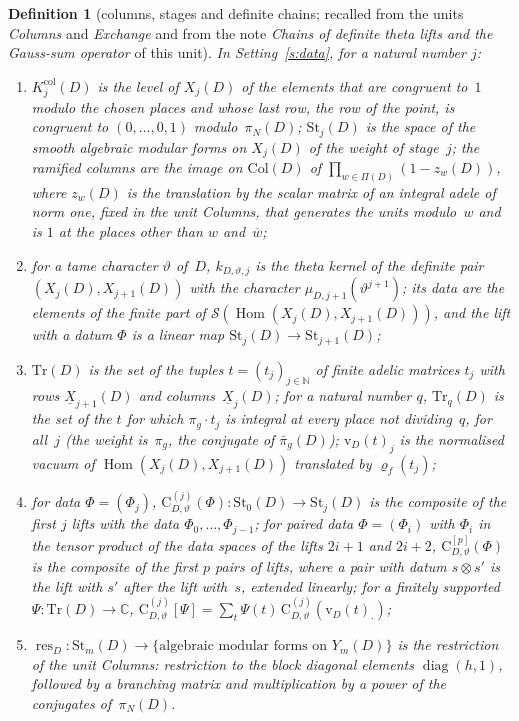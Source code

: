 \documentclass[11pt,a4paper]{article}
\newcommand{\Hom}{\operatorname{Hom}}
\newcommand{\m}[1]{\mbox{$#1$}}        %
\theoremstyle{plainx}
\theoremstyle{uprightx}
\newtheorem{definition}[theorem]{Definition}
\newcommand{\CC}{\mathbb{C}}
\newcommand{\NN}{\mathbb{N}}
\newcommand{\cj}[1]{\overline{#1}}
\newcommand{\tensor}{\otimes}
\newcommand{\piN}[1]{\pi_N(#1)}                    %
\newcommand{\piGb}[1]{\bar\pi_g(#1)}               %
\newcommand{\XI}[2]{\underline{X}_{#2}(#1)}        %
\newcommand{\Xs}[2]{X_{#2}(#1)}                    %
\newcommand{\Ys}[2]{Y_{#2}(#1)}                    %
\newcommand{\PiD}[1]{\Pi(#1)}                      %
\newcommand{\muc}[3]{\mu_{#1,#3}(#2)}              %
\newcommand{\Col}[1]{\mathrm{Col}(#1)}             %
\newcommand{\Stg}[2]{\mathrm{St}_{#2}(#1)}         %
\newcommand{\Tr}[1]{\mathrm{Tr}(#1)}               %
\newcommand{\Tadm}[2]{\mathrm{Tr}_{#2}(#1)}        %
\newcommand{\tdat}[3]{\mathrm{v}_{#1}(#2)_{#3}}    %
\newcommand{\Kst}[2]{K^{\mathrm{col}}_{#2}(#1)}                   %
\newcommand{\kerX}[3]{k_{#1,#2,#3}}                %
\newcommand{\chn}[4]{\mathrm{C}^{(#4)}_{#1,#2}(#3)}        %
\newcommand{\chnn}[4]{\mathrm{C}^{[#4]}_{#1,#2}(#3)}       %
\newcommand{\chcomb}[4]{\mathrm{C}^{(#4)}_{#1,#2}[#3]}     %
\newcommand{\resY}[1]{\operatorname{res}_{#1}}     %
\newcommand{\zw}[2]{z_{#2}(#1)}                     %
\begin{document}
\begin{definition}[columns, stages and definite chains; recalled from the units \emph{Columns} and
\emph{Exchange} and from the note \emph{Chains of definite theta lifts and the Gauss-sum operator} of this
unit]\label{d:columns}
In Setting~\ref{s:data}, for a natural number $j$:
\begin{enumerate}[label=(\alph*)]
\item $\Kst{D}{j}$ is the level of $\Xs{D}{j}$ of the elements that are congruent to~$1$ modulo the chosen places
  and whose last row, the row of the point, is congruent to \m{(0,\dots,0,1)} modulo~$\piN{D}$; $\Stg{D}{j}$ is the
  space of the smooth algebraic modular forms on $\Xs{D}{j}$ of the weight of stage~$j$; the ramified columns are
  the image on $\Col{D}$ of \m{\prod_{w\in\PiD{D}}(1-\zw{D}{w})}, where $\zw{D}{w}$ is the translation by the scalar
  matrix of an integral adele of norm one, fixed in the unit \emph{Columns}, that generates the units modulo~$w$
  and is $1$ at the places other than $w$ and~$\cj w$;
\item for a tame character $\vartheta$ of~$D$, \m{\kerX{D}{\vartheta}{j}} is the theta kernel of the definite pair
  \m{(\Xs{D}{j},\Xs{D}{j+1})} with the character \m{\muc{D}{\vartheta^{j+1}}{j+1}}; its data are the elements of
  the finite part of $\mathcal{S}(\Hom(\Xs{D}{j},\Xs{D}{j+1}))$, and the lift with a datum $\Phi$ is a linear map
  $\Stg{D}{j}\to\Stg{D}{j+1}$;
\item $\Tr{D}$ is the set of the tuples \m{t=(t_j)_{j\in\NN}} of finite adelic matrices $t_j$ with rows
  $\XI{D}{j+1}$ and columns~$\XI{D}{j}$; for a natural number $q$, $\Tadm{D}{q}$ is the set of the $t$ for which
  \m{\pi_g\cdot t_j} is integral at every place not dividing~$q$, for all~$j$ (the weight is~$\pi_g$, the conjugate of
  $\piGb{D}$); \m{\tdat{D}{t}{j}} is the
  normalised vacuum of \m{\Hom(\Xs{D}{j},\Xs{D}{j+1})} translated by \m{\varrho_f(t_j)};
\item for data \m{\Phi=(\Phi_j)}, $\chn{D}{\vartheta}{\Phi}{j}\colon\Stg{D}{0}\to\Stg{D}{j}$ is the composite of
  the first $j$ lifts with the data \m{\Phi_0,\dots,\Phi_{j-1}}; for paired data \m{\Phi=(\Phi_i)} with $\Phi_i$ in the
  tensor product of the data spaces of the lifts \m{2i+1} and \m{2i+2}, $\chnn{D}{\vartheta}{\Phi}{p}$ is the
  composite of the first $p$ pairs of lifts, where a pair with datum $s\tensor s'$ is the lift with $s'$ after the
  lift with~$s$, extended linearly; for a finitely supported $\Psi\colon\Tr{D}\to\CC$,
  $\chcomb{D}{\vartheta}{\Psi}{j}=\sum_t\Psi(t)\,\chn{D}{\vartheta}{\tdat{D}{t}{\cdot}}{j}$;
\item $\resY{D}\colon\Stg{D}{m}\to\{\text{algebraic modular forms on }\Ys{D}{m}\}$ is the restriction of the unit
  \emph{Columns}: restriction to the block diagonal elements \m{\operatorname{diag}(h,1)}, followed by a branching
  matrix and multiplication by a power of the conjugates of~$\piN{D}$.
\end{enumerate}
\end{definition}
\end{document}
